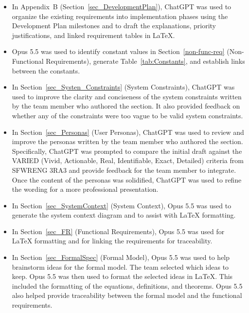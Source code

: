 \documentclass[10pt]{article}
\begin{document}
\begin{itemize}
    \item In Appendix~B (Section~\ref{sec_DevelopmentPlan}), ChatGPT was used
    to organize the existing requirements into implementation phases using
    the Development Plan milestones and to draft the explanations, priority
    justifications, and linked requirement tables in \LaTeX{}.

    \item Opus 5.5 was used to identify constant values in Section~\ref{non-func-req} (Non-Functional Requirements),
    generate Table~\ref{tab:Constants}, and establish links between the constants.

    \item In Section~\ref{sec_Systen_Constraints} (System Constraints), ChatGPT was used to improve
    the clarity and conciseness of the system constraints written by the
    team member who authored the section. It also provided feedback on
    whether any of the constraints were too vague to be valid system constraints.

    \item In Section~\ref{sec_Personas} (User Personas), ChatGPT was used to review and
    improve the personas written by the team member who authored the section.
    Specifically, ChatGPT was prompted to compare the initial draft against
    the VARIED (Vivid, Actionable, Real, Identifiable, Exact, Detailed) criteria
    from SFWRENG 3RA3 and provide feedback for the team member to integrate.
    Once the content of the personas was solidified, ChatGPT was used to
    refine the wording for a more professional presentation.

    \item In Section~\ref{sec_SystemContext} (System Context), Opus 5.5 was
    used to generate the system context diagram and to assist with \LaTeX{}
    formatting.

    \item In Section~\ref{sec_FR} (Functional Requirements), Opus 5.5 was used
    for \LaTeX{} formatting and for linking the requirements for traceability.

    \item In Section~\ref{sec_FormalSpec} (Formal Model), Opus 5.5 was used to
    help brainstorm ideas for the formal model. The team selected which ideas
    to keep. Opus 5.5 was then used to format the selected ideas in \LaTeX{}.
    This included the formatting of the equations, definitions, and theorems.
    Opus 5.5 also helped provide traceability between the formal model and
    the functional requirements.


\end{itemize}
\end{document}
